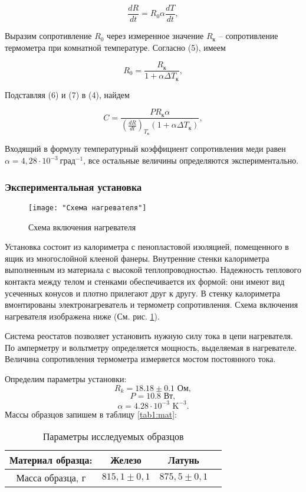 \documentclass[12pt,a4paper]{article}
\newcommand{\figref}[1]{(См. рис. \ref{#1})}
\begin{document}
	\begin{equation}
		\frac{dR}{dt} = R_{0}\alpha \frac{dT}{dt},
		\label{dRT}
	\end{equation}
	
	Выразим сопротивление $R_{0}$ через измеренное значение $R_{\text{к}}$ -- сопротивление термометра при комнатной температуре. Согласно (5), имеем
	
	\begin{equation}
		R_{0} = \frac{R_{\text{к}}}{1 + \alpha \Delta T_{\text{к}}},
		\label{R0}
	\end{equation}
	
	Подставляя (6) и (7) в (4), найдем
	
	\begin{equation}
		C = \frac{PR_{\text{к}} \alpha}{(\frac{dR}{dt})_{T_{\text{к}}}(1 + \alpha \Delta T_{\text{к}})},
		\label{capacity}
	\end{equation}
	
	Входящий в формулу температурный коэффициент сопротивления меди равен $\alpha = 4,28 \cdot 10^{-3}~\text{град}^{-1}$, все остальные величины определяются экспериментально. 
	
	\subsubsection*{Экспериментальная установка}
		\begin{figure}[h!]
		\centering
		\texttt{[image: "Схема нагревателя"]}
		\caption{Схема включения нагревателя}
		\label{fig:heater}
	\end{figure}
	Установка состоит из калориметра с пенопластовой изоляцией, помещенного в ящик из многослойной клееной фанеры. Внутренние стенки калориметра выполненным из материала с высокой теплопроводностью. Надежность теплового контакта между телом и стенками обеспечивается их формой: они имеют вид усеченных конусов и плотно прилегают друг к другу. В стенку калориметра вмонтированы электронагреватель и термометр сопротивления. Схема включения нагревателя изображена ниже \figref{fig:heater}.
		


 Система реостатов позволяет установить нужную силу тока в цепи нагревателя. По амперметру и вольтметру определяется мощность, выделяемая в нагревателе. Величина сопротивления термометра измеряется мостом постоянного тока.


Определим параметры установки: 
$$R_k = 18.18 \pm 0.1 \text{ Ом},$$
$$P = 10.8 \text{ Вт},$$
$$\alpha = 4.28\cdot10^{-3} \text{ K}^{-3}.$$
Массы образцов запишем в таблицу \ref{tab1:mat}:
\begin{table}[h!]
	\label{tab1:mat}
	\centering
	\footnotesize
	\begin{tabular}{|c|c|c|c|}
		\hline
		Материал образца: & Железо          & Латунь           \\ \hline
		Масса образца, г  & $815,1 \pm 0,1$ & $875,5 \pm 0,1$  \\ \hline
	\end{tabular}
	\caption{Параметры исследуемых образцов}
	\label{tab:param_of_facility}
\end{table}
\end{document}
